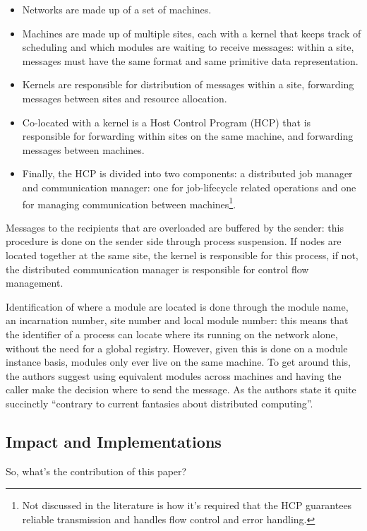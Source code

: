 \begin{itemize}
\item Networks are made up of a set of machines.
\item Machines are made up of multiple sites, each with a kernel that keeps track of scheduling and which modules are waiting to receive messages: within a site, messages must have the same format and same primitive data representation.
\item Kernels are responsible for distribution of messages within a site, forwarding messages between sites and resource allocation.
\item Co-located with a kernel is a Host Control Program (HCP) that is responsible for forwarding within sites on the same machine, and forwarding messages between machines.
\item Finally, the HCP is divided into two components: a distributed job manager and communication manager: one for job-lifecycle related operations and one for managing communication between machines\footnote{Not discussed in the literature is how it's required that the HCP guarantees reliable transmission and handles flow control and error handling.}.
\end{itemize}

Messages to the recipients that are overloaded are buffered by the sender: this procedure is done on the sender side through process suspension.  If nodes are located together at the same site, the kernel is responsible for this process, if not, the distributed communication manager is responsible for control flow management.

Identification of where a module are located is done through the module name, an incarnation number, site number and local module number: this means that the identifier of a process can locate where its running on the network alone, without the need for a global registry.  However, given this is done on a module instance basis, modules only ever live on the same machine.  To get around this, the authors suggest using equivalent modules across machines and having the caller make the decision where to send the message.  As the authors state it quite succinctly ``contrary to current fantasies about distributed computing''.

\subsection{Impact and Implementations}
So, what's the contribution of this paper?

